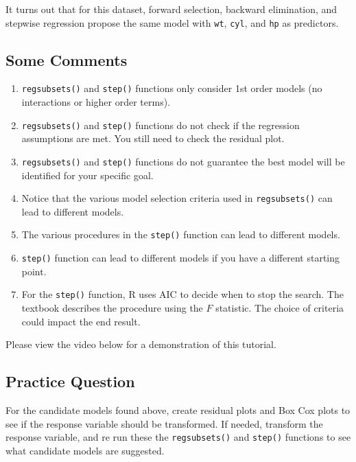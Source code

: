 \documentclass[
]{book}
\providecommand{\tightlist}{%
  \setlength{\itemsep}{0pt}\setlength{\parskip}{0pt}}
\begin{document}
It turns out that for this dataset, forward selection, backward elimination, and stepwise regression propose the same model with \texttt{wt}, \texttt{cyl}, and \texttt{hp} as predictors.

\hypertarget{some-comments}{%
\subsection*{Some Comments}\label{some-comments}}

\begin{enumerate}
\def\labelenumi{\arabic{enumi}.}
\tightlist
\item
  \texttt{regsubsets()} and \texttt{step()} functions only consider 1st order models (no interactions or higher order terms).
\item
  \texttt{regsubsets()} and \texttt{step()} functions do not check if the regression assumptions are met. You still need to check the residual plot.
\item
  \texttt{regsubsets()} and \texttt{step()} functions do not guarantee the best model will be identified for your specific goal.
\item
  Notice that the various model selection criteria used in \texttt{regsubsets()} can lead to different models.
\item
  The various procedures in the \texttt{step()} function can lead to different models.
\item
  \texttt{step()} function can lead to different models if you have a different starting point.
\item
  For the \texttt{step()} function, R uses AIC to decide when to stop the search. The textbook describes the procedure using the \(F\) statistic. The choice of criteria could impact the end result.
\end{enumerate}

Please view the video below for a demonstration of this tutorial.

\hypertarget{practice-question-2}{%
\subsection*{Practice Question}\label{practice-question-2}}

For the candidate models found above, create residual plots and Box Cox plots to see if the response variable should be transformed. If needed, transform the response variable, and re run these the \texttt{regsubsets()} and \texttt{step()} functions to see what candidate models are suggested.
\end{document}
